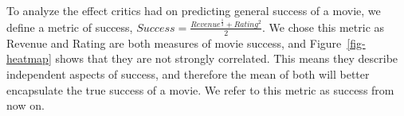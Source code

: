         \paragraph{}
            To analyze the effect critics had on predicting general success of a movie, we
                define a metric of success, $Success = \frac{Revenue^\frac{1}{3} +
                        Rating^2}{2}$.
            We chose this metric as Revenue and Rating are both measures of movie success,
                and Figure~\ref{fig-heatmap} shows that they are not strongly correlated.
            This means they describe independent aspects of success, and therefore the mean
                of both will better encapsulate the true success of a movie.
            We refer to this metric as success from now on.

